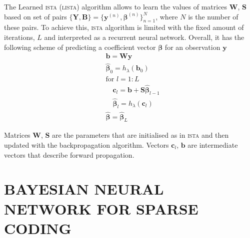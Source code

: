 \documentclass[letterpaper]{article}
\begin{document}
The Learned \textsc{ista} (\textsc{lista}) \citep{gregor2010learning} algorithm allows to learn the values of matrices $\mathbf{W}$, $\mathbf{S}$ based on set of pairs $\{\mathbf{Y}, \mathbf{B}\}=\{\mathbf{y}^{(n)}, \boldsymbol\beta^{(n)}\}_{n=1}^N$, where $N$ is the number of these pairs. To achieve this, \textsc{ista} algorithm is limited with the fixed amount of iterations, $L$ and interpreted as a recurrent neural network. Overall, it has the following scheme of predicting a coefficient vector $\boldsymbol\beta$ for an observation $\mathbf{y}$
\begin{align}
&\mathbf{b} = \mathbf{W}\mathbf{y}\\
&\widehat{\boldsymbol\beta}_0 = h_\lambda(\mathbf{b}_0) \\
&\text{for } l=1:L\\
	&\quad \mathbf{c}_l = \mathbf{b} + \mathbf{S}\widehat{\boldsymbol\beta}_{l-1} \\
	&\quad \widehat{\boldsymbol\beta}_{l} = h_\lambda(\mathbf{c}_l) \\
& \widehat{\boldsymbol\beta} = \widehat{\boldsymbol\beta}_{L}
\end{align}

Matrices $\mathbf{W}$, $\mathbf{S}$ are the parameters that are initialised as in \textsc{ista} and then updated with the backpropagation algorithm. Vectors $\mathbf{c}_l$, $\mathbf{b}$ are intermediate vectors that describe forward propagation. 

\section{\uppercase{Bayesian neural network for sparse coding}}
\label{sec:bayesian_lista}
\end{document}
